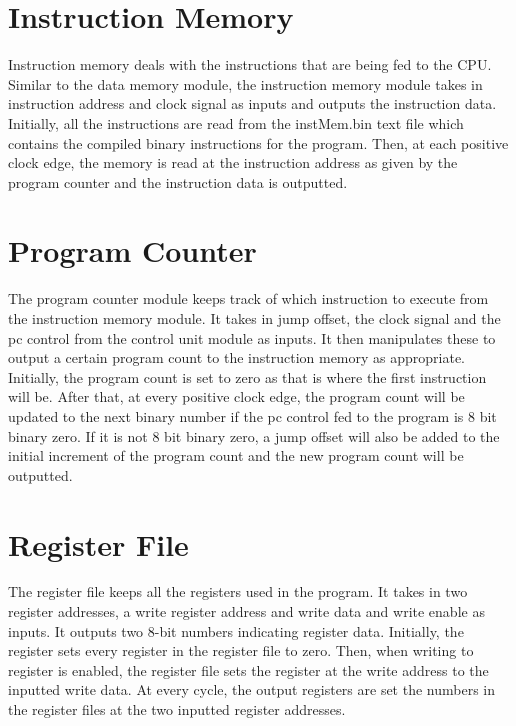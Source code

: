 \documentclass[journal]{IEEEtran}
\begin{document}
\section{Instruction Memory}
Instruction memory deals with the instructions that are being fed to the CPU. Similar to the data memory module, the instruction memory module takes in instruction address and clock signal as inputs and outputs the instruction data. Initially, all the instructions are read from the instMem.bin text file which contains the compiled binary instructions for the program. Then, at each positive clock edge, the memory is read at the instruction address as given by the program counter and the instruction data is outputted.

\section{Program Counter}
The program counter module keeps track of which instruction to execute from the instruction memory module. It takes in jump offset, the clock signal and the pc control from the control unit module as inputs. It then manipulates these to output a certain program count to the instruction memory as appropriate. Initially, the program count is set to zero as that is where the first instruction will be. After that, at every positive clock edge, the program count will be updated to the next binary number if the pc control fed to  the program is 8 bit binary zero. If it is not 8 bit binary zero, a jump offset will also be added to the initial increment of the program count and the new program count will be outputted. 

\section{Register File}
The register file keeps all the registers used in the program. It takes in two register addresses, a write register address and write data and  write enable as inputs. It outputs two 8-bit numbers indicating register data. Initially, the register sets every register in the register file to zero. Then, when writing to register is enabled, the register file sets the register at the write address to the inputted write data. At every cycle, the output registers are set the numbers in the register files at the two inputted register addresses.

\appendices
\end{document}
